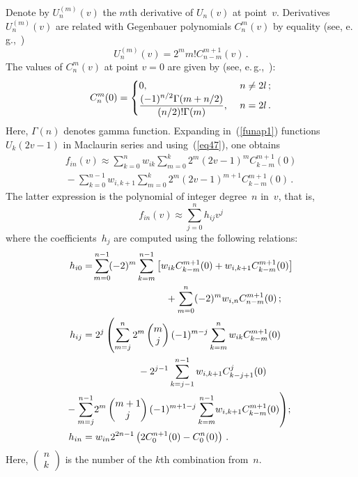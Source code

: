 \begin{multicols}{2}
Denote by $U^{(m)}_{n}(v)$ the $m$th derivative of $U_n(v)$ at point~$v$.
Derivatives $U^{(m)}_{n}(v)$ are related with Gegenbauer polynomials $C^m_n(v)$
by equality (see, e.\,g.,~\cite[p.\,186]{erdelyi})
\begin{equation}
U^{(m)}_{n}(v)= 2^m m! C_{n-m}^{m+1} (v)\,.
\label{eq47}
\end{equation}
The values of $C^m_n(v)$ at point $v=0$ are given by (see, 
e.\,g.,~\cite[p.\,175]{erdelyi}):
\begin{equation*}
C_{n}^{m} (0)= 
\begin{cases}
    0, &\ n \ne 2l\,;  \\
   \displaystyle\frac{\displaystyle (-1)^{n/2} {\Gamma} (m + {n/2})\mathstrut}{\displaystyle ({n/2})! {\Gamma} (m)\mathstrut}, &\ n=2l\,.
\end{cases}
\end{equation*}
Here, ${\Gamma} (n)$ denotes gamma function. Expanding in~(\ref{funap1}) 
functions $U_{k}(2v-1)$ in Maclaurin series and using~(\ref{eq47}), one obtains
\begin{multline*}
f_{in}(v) \approx \sum\limits_{k=0}^n w_{ik} \sum\limits_{m=0}^{k}
2^m (2v-1)^m C_{k-m}^{m+1} (0)\\
{} -
\sum\limits_{k=0}^{n-1} w_{i,k+1} \sum\limits_{m=0}^{k} 2^m (2v-1)^{m+1} 
C_{k-m}^{m+1} (0)\,.
\end{multline*}
The latter expression
is the polynomial of integer degree~$n$ in~$v$, that is,
\begin{equation}
\label{funap2}
f_{in}(v) \approx \sum\limits_{j=0}^n h_{ij} v^j
\end{equation}
where the coefficients~$h_j$ are computed using the following relations:
\begin{align*}
h_{i0}&=\! \sum\limits_{m=0}^{n-1} \!(-2)^m \sum\limits_{k=m}^{n-1} \left[w_{ik}
C_{k-m}^{m+1} (0) + w_{i,k+1} C_{k-m}^{m+1} (0)\right]\\
& \hspace*{30mm}{}+ \sum\limits_{m=0}^{n} (-2)^m w_{i,n} C_{n-m}^{m+1} (0)\,;
\\
h_{ij}&= 2^j \left( \sum\limits_{m=j}^{n} 2^m \begin{pmatrix}{m}\\{j}\end{pmatrix}
(-1)^{m-j} \sum\limits_{k=m}^n w_{ik} C_{k-m}^{m+1} (0)\right.\\
&\hspace*{20mm}{}- 2^{j-1} \sum\limits_{k=j-1}^{n-1} w_{i,k+1} C_{k-j+1}^{j} (0) 
\\
&\hspace*{-7mm}\left. {}-\sum\limits_{m=j}^{n-1}\! 2^m \begin{pmatrix}{m+1}\\{j}\end{pmatrix}
 (-1)^{m+1-j} \sum\limits_{k=m}^{n-1}\!
w_{i,k+1} C_{k-m}^{m+1} (0) \right)\!;
\\
h_{in}&= w_{in} 2^{2n-1} \left ( 2 C_{0}^{n+1} (0) -
C_{0}^{n} (0) \right)\,.
\end{align*}
Here, $\begin{pmatrix}{n}\\{k}\end{pmatrix}$ is the number of the $k$th combination from~$n$.


\end{multicols}
